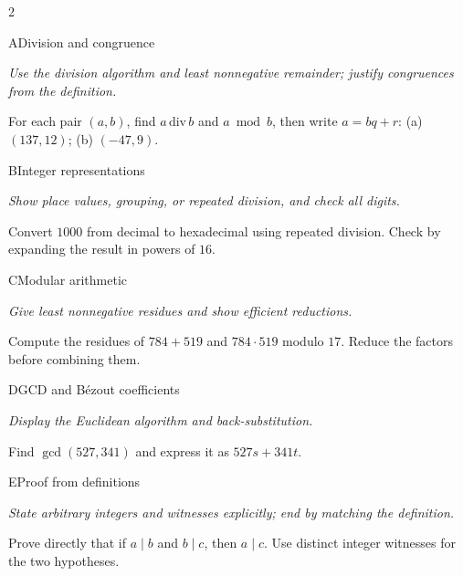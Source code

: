 \documentclass[9pt]{extarticle}
\begin{document}
\begin{multicols}{2}
\begin{CoreProblem}{A}{Division and congruence}
{\scriptsize\textit{Use the division algorithm and least nonnegative remainder; justify congruences from the definition.}\par}
For each pair $(a,b)$, find $a\,\mathrm{div}\,b$ and $a\bmod b$, then write
$a=bq+r$: (a) $(137,12)$; (b) $(-47,9)$.
\end{CoreProblem}
\begin{CoreProblem}{B}{Integer representations}
{\scriptsize\textit{Show place values, grouping, or repeated division, and check all digits.}\par}
Convert $1000$ from decimal to hexadecimal using repeated division. Check by
expanding the result in powers of $16$.
\end{CoreProblem}
\begin{CoreProblem}{C}{Modular arithmetic}
{\scriptsize\textit{Give least nonnegative residues and show efficient reductions.}\par}
Compute the residues of $784+519$ and $784\cdot519$ modulo $17$. Reduce the
factors before combining them.
\end{CoreProblem}
\columnbreak
\begin{CoreProblem}{D}{GCD and B\'ezout coefficients}
{\scriptsize\textit{Display the Euclidean algorithm and back-substitution.}\par}
Find $\gcd(527,341)$ and express it as $527s+341t$.
\end{CoreProblem}
\begin{CoreProblem}{E}{Proof from definitions}
{\scriptsize\textit{State arbitrary integers and witnesses explicitly; end by matching the definition.}\par}
Prove directly that if $a\mid b$ and $b\mid c$, then $a\mid c$. Use distinct
integer witnesses for the two hypotheses.
\end{CoreProblem}
\end{multicols}
\CoreWorkArea
\FormBreak
{}
\end{document}
